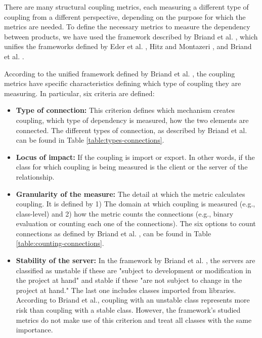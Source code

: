 There are many structural coupling metrics, each measuring a different type of coupling from a different perspective, depending on the purpose for which the metrics are needed. To define the necessary metrics to measure the dependency between products, we have used the framework described by Briand et al. \cite{briand1999unified}, which unifies the frameworks defined by Eder et al. \cite{eder1994coupling}, Hitz and Montazeri \cite{hitz1995measuring}, and Briand et al. \cite{briand1997investigation}.

According to the unified framework defined by Briand et al. \cite{briand1999unified}, the coupling metrics have specific characteristics defining which type of coupling they are measuring. In particular, six criteria are defined:

\begin{itemize}
  \item \textbf{Type of connection:} This criterion defines which mechanism creates coupling, which type of dependency is measured, how the two elements are connected. The different types of connection, as described by Briand et al. \cite{briand1999unified} can be found in Table \ref{table:types-connections}.

  \item \textbf{Locus of impact:} If the coupling is import or export. In other words, if the class for which coupling is being measured is the client or the server of the relationship.

  \item \textbf{Granularity of the measure:} The detail at which the metric calculates coupling. It is defined by 1) The domain at which coupling is measured (e.g., class-level) and 2) how the metric counts the connections (e.g., binary evaluation or counting each one of the connections). The six options to count connections as defined by Briand et al. \cite{briand1999unified}, can be found in Table \ref{table:counting-connections}.

  \item \textbf{Stability of the server:} In the framework by Briand et al. \cite{briand1999unified}, the servers are classified as unstable if these are  "subject to development or modification in the project at hand" and stable if these "are not subject to change in the project at hand." The last one includes classes imported from libraries. According to Briand et al., coupling with an unstable class represents more risk than coupling with a stable class. However, the framework's studied metrics do not make use of this criterion and treat all classes with the same importance.


\end{itemize}

